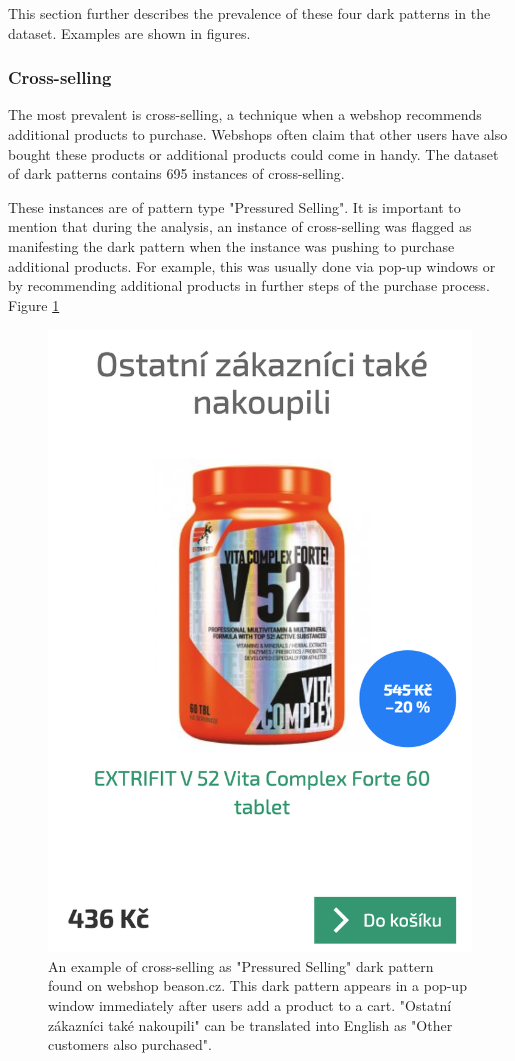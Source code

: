     This section further describes the prevalence of these four dark patterns in the dataset. Examples are shown in figures.
    
    \subsubsection*{Cross-selling}
    The most prevalent is cross-selling, a technique when a webshop recommends additional products to purchase. Webshops often claim that other users have also bought these products or additional products could come in handy. The dataset of dark patterns contains 695 instances of cross-selling.

    These instances are of pattern type "Pressured Selling". It is important to mention that during the analysis, an instance of cross-selling was flagged as manifesting the dark pattern when the instance was pushing to purchase additional products. For example, this was usually done via pop-up windows or by recommending additional products in further steps of the purchase process. Figure \ref{fig:cross-selling}

    \begin{figure}[ht]
        \centering
        \includegraphics[width=0.5\linewidth]{media/beason.cz-cross-selling.png}
        \caption{An example of cross-selling as "Pressured Selling" dark pattern found on webshop beason.cz. This dark pattern appears in a pop-up window immediately after users add a product to a cart. "Ostatní zákazníci také nakoupili" can be translated into English as "Other customers also purchased".}
        \label{fig:cross-selling}
    \end{figure}

